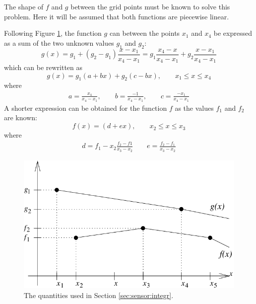  The shape of $f$ and $g$ between the grid points must be known to
 solve this problem. Here it will be assumed that both functions are
 piecewise linear.
  
 Following Figure \ref{fig:sensor:vecintegr}, the function $g$ can between
 the points $x_1$ and $x_4$ be expressed as a sum of the two unknown
 values $g_1$ and $g_2$:
 \begin{equation}
   g(x) = g_1 + (g_2-g_1)\frac{x-x_1}{x_4-x_1} =
           g_1 \frac{x_4-x}{x_4-x_1} + g_2\frac{x-x_1}{x_4-x_1}
 \end{equation}
 which can be rewritten as
 \begin{equation}
   g(x) = g_1(a+bx)+g_2(c-bx), \qquad x_1 \leq x \leq x_4
 \end{equation}
 where
 \begin{eqnarray}
    a=\frac{x_4}{x_4-x_1}, \qquad b=\frac{-1}{x_4-x_1}, \qquad 
    c=\frac{-x_1}{x_4-x_1}   \nonumber
 \end{eqnarray} 
 A shorter expression can be obtained for the function $f$ as the
 values $f_1$ and $f_2$ are known:
 \begin{equation}
   f(x) = (d+ex), \qquad x_2 \leq x \leq x_3
 \end{equation}
 where 
 \begin{eqnarray}
    d=f_1-x_2\frac{f_2-f1}{x_3-x_2} \qquad e=\frac{f_2-f_1}{x_3-x_2} \nonumber
 \end{eqnarray}
 \begin{figure}[tb]
    \begin{center}
      \includegraphics*{Figs/vecintegr}
      \caption{The quantities used in Section \ref{sec:sensor:integr}.}  
      \label{fig:sensor:vecintegr} 
    \end{center} 
 \end{figure}
